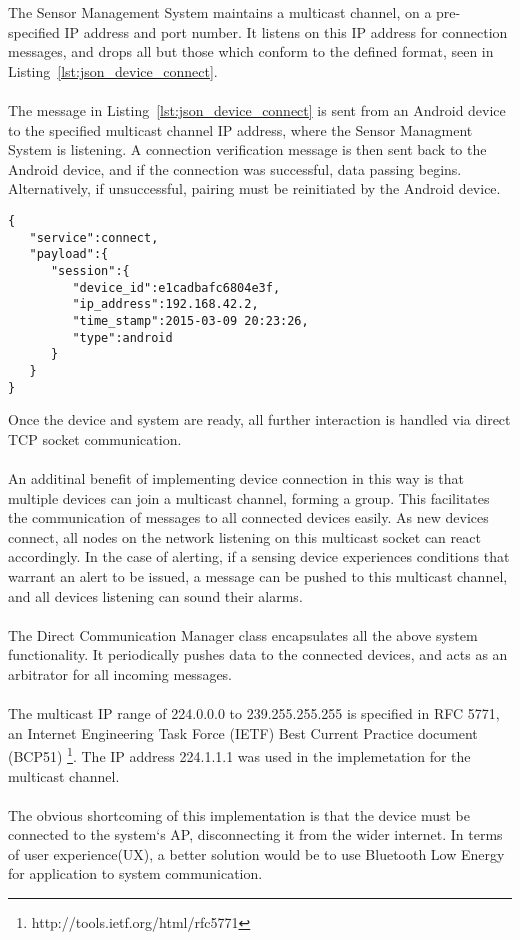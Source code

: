\documentclass{article}
\begin{document}
The Sensor Management System maintains a multicast channel, on a pre-specified IP address and port number. It listens on this IP address for connection messages, and drops all but those which conform to the defined format, seen in Listing~\ref{lst:json_device_connect}. \\\\
The message in Listing~\ref{lst:json_device_connect} is sent from an Android device to the specified multicast channel IP address, where the Sensor Managment System is listening. A connection verification message is then sent back to the Android device, and if the connection was successful, data passing begins. Alternatively, if unsuccessful, pairing must be reinitiated by the Android device.
\begin{lstlisting}[caption={JSON Connection Message Object},label={lst:json_device_connect}]
{  
   "service":connect,
   "payload":{  
      "session":{  
         "device_id":e1cadbafc6804e3f,
         "ip_address":192.168.42.2,
         "time_stamp":2015-03-09 20:23:26,
         "type":android
      }
   }
}
\end{lstlisting}
Once the device and system are ready, all further interaction is handled via direct TCP socket communication.\\\\
An additinal benefit of implementing device connection in this way is that multiple devices can join a multicast channel, forming a group. This facilitates the communication of messages to all connected devices easily. As new devices connect, all nodes on the network listening on this multicast socket can react accordingly. In the case of alerting, if a sensing device experiences conditions that warrant an alert to be issued, a message can be pushed to this multicast channel, and all devices listening can sound their alarms. \\\\
The Direct Communication Manager class encapsulates all the above system functionality. It periodically pushes data to the connected devices, and acts as an arbitrator for all incoming messages.\\\\
The multicast IP range of 224.0.0.0 to 239.255.255.255 is specified in RFC 5771, an Internet Engineering Task Force (IETF) Best Current Practice document (BCP51)
\footnote{http://tools.ietf.org/html/rfc5771}. The IP address 224.1.1.1 was used in the implemetation for the multicast channel. \\\\
The obvious shortcoming of this implementation is that the device must be connected to the system\lq s AP, disconnecting it from the wider internet. In terms of user experience(UX), a better solution would be to use Bluetooth Low Energy for application to system communication. 
\end{document}
